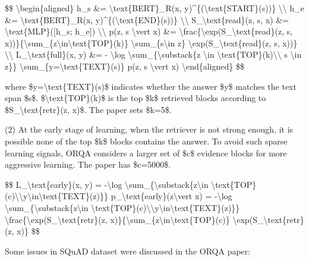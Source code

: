 \$\$ \textbackslash begin\{aligned\} h\_s \&= \textbackslash text\{BERT\}\_R(x, y)\^{}\{(\textbackslash text\{START\}(s))\} \textbackslash\textbackslash{} h\_e \&= \textbackslash text\{BERT\}\_R(x, y)\^{}\{(\textbackslash text\{END\}(s))\} \textbackslash\textbackslash{} S\_\textbackslash text\{read\}(z, s, x) \&= \textbackslash text\{MLP\}({[}h\_s; h\_e{]}) \textbackslash\textbackslash{} p(z, s \textbackslash vert x) \&= \textbackslash frac\{\textbackslash exp(S\_\textbackslash text\{read\}(z, s, x))\}\{\textbackslash sum\_\{z\textquotesingle\textbackslash in\textbackslash text\{TOP\}(k)\} \textbackslash sum\_\{s\textquotesingle\textbackslash in z\textquotesingle\} \textbackslash exp(S\_\textbackslash text\{read\}(z\textquotesingle, s\textquotesingle, x))\} \textbackslash\textbackslash{} L\_\textbackslash text\{full\}(x, y) \&= - \textbackslash log \textbackslash sum\_\{\textbackslash substack\{z \textbackslash in \textbackslash text\{TOP\}(k)\textbackslash\textbackslash{} s \textbackslash in z\}\} \textbackslash sum\_\{y=\textbackslash text\{TEXT\}(s)\} p(z, s \textbackslash vert x) \textbackslash end\{aligned\} \$\$

where \$y=\textbackslash text\{TEXT\}(s)\$ indicates whether the answer \$y\$ matches the text span \$s\$. \$\textbackslash text\{TOP\}(k)\$ is the top \$k\$ retrieved blocks according to \$S\_\textbackslash text\{retr\}(z, x)\$. The paper sets \$k=5\$.

(2) At the early stage of learning, when the retriever is not strong enough, it is possible none of the top \$k\$ blocks contains the answer. To avoid such sparse learning signals, ORQA considers a larger set of \$c\$ evidence blocks for more aggressive learning. The paper has \$c=5000\$.

\$\$ L\_\textbackslash text\{early\}(x, y) = -\textbackslash log \textbackslash sum\_\{\textbackslash substack\{z\textbackslash in \textbackslash text\{TOP\}(c)\textbackslash\textbackslash y\textbackslash in\textbackslash text\{TEXT\}(z)\}\} p\_\textbackslash text\{early\}(z\textbackslash vert x) = -\textbackslash log \textbackslash sum\_\{\textbackslash substack\{z\textbackslash in \textbackslash text\{TOP\}(c)\textbackslash\textbackslash y\textbackslash in\textbackslash text\{TEXT\}(z)\}\} \textbackslash frac\{\textbackslash exp(S\_\textbackslash text\{retr\}(z, x)\}\{\textbackslash sum\_\{z\textquotesingle\textbackslash in\textbackslash text\{TOP\}(c)\} \textbackslash exp(S\_\textbackslash text\{retr\}(z\textquotesingle, x)\} \$\$

Some issues in SQuAD dataset were discussed in the ORQA paper:

